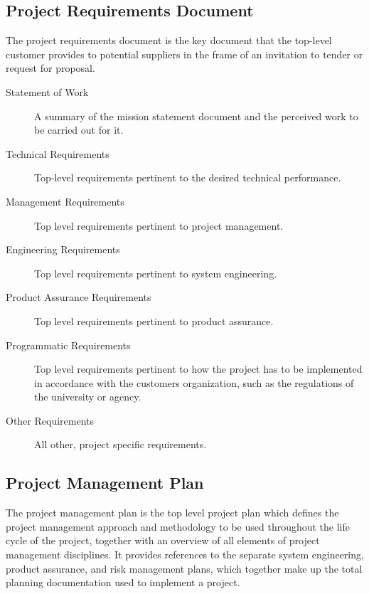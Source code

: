 \subsection{Project Requirements Document}
\label{sec:Project Requirements Document}
The project requirements document is the key document that the top-level customer provides to potential suppliers in the frame of an invitation to tender or request for proposal.

\begin{description}
\item[Statement of Work]
A summary of the mission statement document and the perceived work to be carried out for it.
\item[Technical Requirements]
Top-level requirements pertinent to the desired technical performance.
\item[Management Requirements]
Top level requirements pertinent to project management.
\item[Engineering Requirements]
Top level requirements pertinent to system engineering.
\item[Product Assurance Requirements]
Top level requirements pertinent to product assurance.
\item[Programmatic Requirements]
Top level requirements pertinent to how the project has to be implemented in accordance with the customers organization, such as the regulations of the university or agency.
\item[Other Requirements]
All other, project specific requirements.
\end{description}


\subsection{Project Management Plan}
\label{sec:Project Management Plan}
The project management plan is the top level project plan which defines the project management approach and methodology to be used throughout the life cycle of the project, together with an overview of all elements of project management disciplines. It provides references to the separate system engineering, product assurance, and risk management plans, which together make up the total planning documentation used to implement a project.

